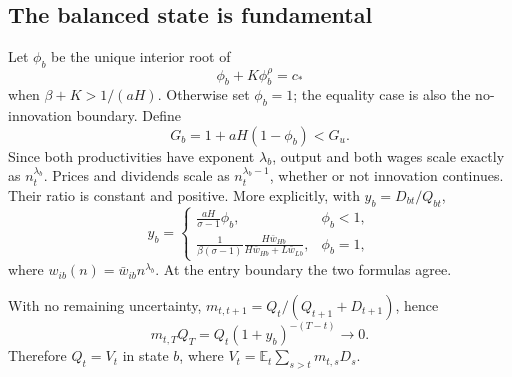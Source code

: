 \documentclass[11pt,a4paper]{article}
\newcommand{\E}{\mathbb E}
\begin{document}
\subsection{The balanced state is fundamental}
Let $\phi_b$ be the unique interior root of
\begin{equation}
\phi_b+K\phi_b^\rho=c_*\label{eq:phib}
\end{equation}
when $\beta+K>1/(aH)$. Otherwise set $\phi_b=1$; the equality case is also
the no-innovation boundary. Define
\begin{equation}
G_b=1+aH(1-\phi_b)<G_u.
\end{equation}
Since both productivities have exponent $\lambda_b$, output and both wages
scale exactly as $n_t^{\lambda_b}$. Prices and dividends scale as
$n_t^{\lambda_b-1}$, whether or not innovation continues. Their ratio is
constant and positive. More explicitly, with $y_b=D_{bt}/Q_{bt}$,
\begin{equation}
y_b=\begin{cases}
\displaystyle\frac{aH}{\sigma-1}\phi_b,&\phi_b<1,\\[4pt]
\displaystyle\frac{1}{\beta(\sigma-1)}
\frac{H\bar w_{Hb}}{H\bar w_{Hb}+L\bar w_{Lb}},&\phi_b=1,
\end{cases}\label{eq:yieldb}
\end{equation}
where $w_{ib}(n)=\bar w_{ib}n^{\lambda_b}$. At the entry boundary the two
formulas agree.

With no remaining uncertainty, $m_{t,t+1}=Q_t/(Q_{t+1}+D_{t+1})$, hence
\begin{equation}
m_{t,T}Q_T=Q_t(1+y_b)^{-(T-t)}\longrightarrow0.
\end{equation}
Therefore $Q_t=V_t$ in state $b$, where
$V_t=\E_t\sum_{s>t}m_{t,s}D_s$.
\end{document}
